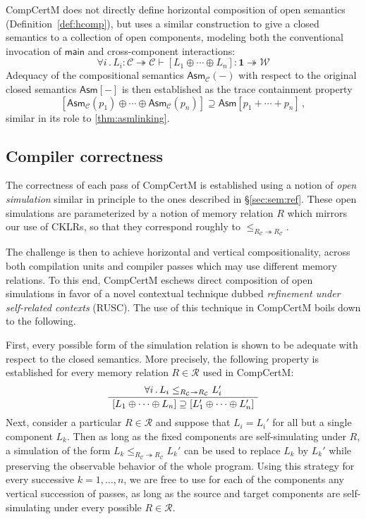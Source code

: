 \documentclass[sigplan,screen,review]{acmart}
\newcommand{\kw}[1]{\ensuremath{ \mathsf{#1} }}
\newenvironment{optional}{}{}
\begin{document}
\begin{optional}
CompCertM does not directly define horizontal composition
of open semantics (Definition~\ref{def:hcomp}),
but uses a similar construction
to give a closed semantics to a collection of open components,
modeling both the conventional invocation of $\kw{main}$
and cross-component interactions:
\[
  \forall i \,.\,
  L_i : \mathcal{C} \twoheadrightarrow \mathcal{C} \vdash
  [L_1 \oplus \cdots \oplus L_n] : \mathbf{1} \twoheadrightarrow \mathcal{W}
\]
Adequacy of the compositional semantics $\kw{Asm}_\mathcal{C}(-)$
with respect to the original closed semantics $\kw{Asm}[-]$
is then established as the trace containment property
\begin{equation} \label{eqn:asmadeq}
  [\kw{Asm}_\mathcal{C}(p_1) \oplus \cdots \oplus \kw{Asm}_\mathcal{C}(p_n)] \supseteq
  \kw{Asm}[p_1 + \cdots + p_n]
  \,,
\end{equation}
similar in its role to \autoref{thm:asmlinking}.


\subsection{Compiler correctness} %

The correctness of each pass of CompCertM
is established using a notion of \emph{open simulation}
similar in principle to the ones described in \S\ref{sec:sem:ref}.
These open simulations
are parameterized by a notion of memory relation $R$
which mirrors our use of CKLRs,
so that they correspond roughly to
$\le_{R_\mathcal{C} \twoheadrightarrow R_\mathcal{C}}$.

The challenge is then to achieve
horizontal and vertical compositionality,
across both compilation units and compiler passes
which may use different memory relations.
To this end,
CompCertM eschews direct composition of open simulations
in favor of a novel contextual technique dubbed
\emph{refinement under self-related contexts} (RUSC).
The use of this technique in CompCertM boils down to the following.

First,
every possible form of the simulation relation
is shown to be adequate with respect to the closed semantics.
More precisely,
the following property is established
for every memory relation $R \in \mathcal{R}$
used in CompCertM:
\begin{equation} \label{eqn:simadeq}
  \AxiomC{$\forall i \,.\,
    L_i \le_{R_\mathcal{C} \twoheadrightarrow R_\mathcal{C}} L_i'$}
  \UnaryInfC{$
    [L_1  \oplus \cdots \oplus L_n] \supseteq
    [L_1' \oplus \cdots \oplus L_n']$}
  \DisplayProof
\end{equation}
Next,
consider a particular $R \in \mathcal{R}$
and suppose that $L_i = L_i'$
for all but a single component $L_k$.
Then
as long as the fixed components are self-simulating under $R$,
a simulation of the form
$L_k \le_{R_\mathcal{C} \twoheadrightarrow R_\mathcal{C}} L_k'$
can be used to replace $L_k$ by $L_k'$
while preserving the observable behavior of the whole program.
Using this strategy for every successive $k = 1, \ldots, n$,
we are free to use for each of the components
any vertical succession of passes,
as long as the source and target components
are self-simulating under every possible $R \in \mathcal{R}$.


\end{optional}
\end{document}
